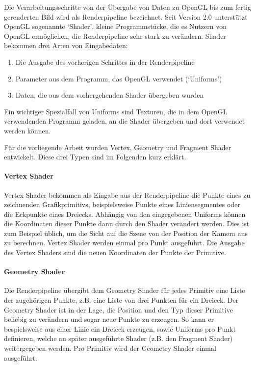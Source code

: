 \documentclass[a4paper,fontsize=12pt,toc=bib,halfparskip,ngerman]{scrartcl}
\begin{document}
Die Verarbeitungsschritte von der \"Ubergabe von Daten zu OpenGL bis zum fertig gerenderten Bild wird als Renderpipeline bezeichnet. Seit Version 2.0 unterst\"utzt OpenGL sogenannte `Shader', kleine Programmst\"ucke, die es Nutzern von OpenGL erm\"oglichen, die Renderpipeline sehr stark zu ver\"andern. Shader bekommen drei Arten von Eingabedaten:

\begin{enumerate}
	\item Die Ausgabe des vorherigen Schrittes in der Renderpipeline
	\item Parameter aus dem Programm, das OpenGL verwendet (`Uniforms')
	\item Daten, die aus dem vorhergehenden Shader \"ubergeben wurden
\end{enumerate}

Ein wichtiger Spezialfall von Uniforms sind Texturen, die in dem OpenGL verwendenden Programm geladen, an die Shader \"ubergeben und dort verwendet werden k\"onnen.

F\"ur die vorliegende Arbeit wurden Vertex, Geometry und Fragment Shader entwickelt. Diese drei Typen sind im Folgenden kurz erkl\"art.

\paragraph{Vertex Shader}
Vertex Shader bekommen als Eingabe aus der Renderpipeline die Punkte eines zu zeichnenden Grafikprimitivs, beispielsweise Punkte eines Liniensegmentes oder die Eckpunkte eines Dreiecks. Abh\"angig von den eingegebenen Uniforms k\"onnen die Koordinaten dieser Punkte dann durch den Shader ver\"andert werden. Dies ist zum Beispiel \"ublich, um die Sicht auf die Szene von der Position der Kamera aus zu berechnen. Vertex Shader werden einmal pro Punkt ausgef\"uhrt. Die Ausgabe des Vertex Shaders sind die neuen Koordinaten der Punkte der Primitive.

\paragraph{Geometry Shader}
Die Renderpipeline \"ubergibt dem Geometry Shader f\"ur jedes Primitiv eine Liste der zugeh\"origen Punkte, z.B. eine Liste von drei Punkten f\"ur ein Dreieck. Der Geometry Shader ist in der Lage, die Position und den Typ dieser Primitive beliebig zu ver\"andern und sogar neue Punkte zu erzeugen. So kann er bespielsweise aus einer Linie ein Dreieck erzeugen, sowie Uniforms pro Punkt definieren, welche an sp\"ater ausgef\"uhrte Shader (z.B. den Fragment Shader) weitergegeben werden. Pro Primitiv wird der Geometry Shader einmal ausgef\"uhrt.
\end{document}
